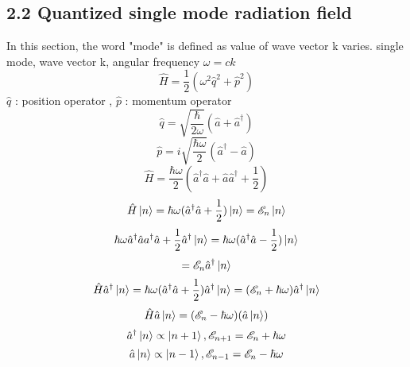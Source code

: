 \documentclass[9pt]{article}
\begin{document}
\subsection{2.2 Quantized single mode radiation field}
In this section, the word "mode" is defined as value of wave vector k varies.
single mode, wave vector k, angular frequency $\omega=ck$
\begin{equation}
    \hat{H}=\frac{1}{2} (\omega^2\hat{q}^2+\hat{p}^2)
\end{equation}
$\hat{q}$ : position operator , $\hat{p}$ : momentum operator
\begin{equation}
    \hat{q}=\sqrt{\frac{\hbar}{2\omega}}(\hat{a}+\hat{a}^\dagger)
\end{equation}
\begin{equation}
    \hat{p}=i\sqrt{\frac{\hbar\omega}{2}}(\hat{a}^\dagger-\hat{a})
\end{equation}
\begin{equation}
    \hat{H}=\frac{\hbar\omega}{2}(\hat{a}^\dagger\hat{a}+\hat{a}\hat{a}^\dagger+\frac{1}{2})
\end{equation}
\begin{equation}
    \hat{H}\ket{n}=\hbar\omega(\hat{a}^\dagger\hat{a}+\frac{1}{2})\ket{n}=\mathscr{E}_n\ket{n}
\end{equation}
\begin{equation}
    \hbar\omega{\hat{a}^\dagger\hat{a}a^\dagger\hat{a}+\frac{1}{2}\hat{a}^\dagger}\ket{n}=\hbar\omega(\hat{a}^\dagger\hat{a}-\frac{1}{2})\ket{n}
\end{equation}
\begin{equation*}
    =\mathscr{E}_n\hat{a}^\dagger\ket{n}
\end{equation*}
\begin{equation}
    \hat{H}\hat{a}^\dagger\ket{n}=
    \hbar\omega(\hat{a}^\dagger\hat{a}+\frac{1}{2})\hat{a}^\dagger\ket{n}=(\mathscr{E}_n+\hbar\omega)\hat{a}^\dagger\ket{n}
\end{equation}
\begin{equation}
    \hat{H}\hat{a}\ket{n}=(\mathscr{E}_n-\hbar\omega)(\hat{a}\ket{n})
\end{equation}
\begin{equation}
    \hat{a}^\dagger\ket{n}\propto\ket{n+1} , \mathscr{E}_{n+1}=\mathscr{E}_n+\hbar\omega
\end{equation}
\begin{equation}
    \hat{a}\ket{n}\propto\ket{n-1} , \mathscr{E}_{n-1}=\mathscr{E}_n-\hbar\omega
\end{equation}
\end{document}
